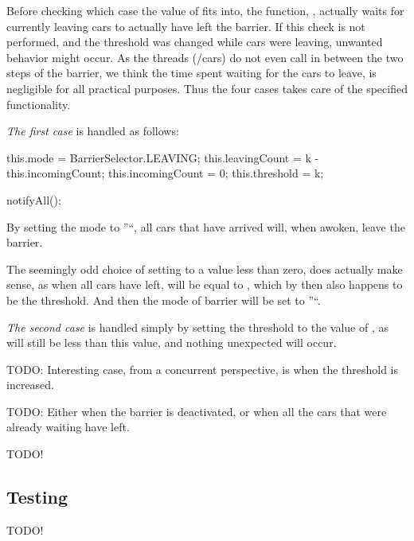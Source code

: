 Before checking which case the value of  fits into, the function, , actually waits for currently leaving cars to actually have left the barrier. If this check is not performed, and the threshold was changed while cars were leaving, unwanted behavior might occur. As the threads (/cars) do not even call  in between the two steps of the barrier, we think the time spent waiting for the cars to leave, is negligible for all practical purposes. Thus the four cases takes care of the specified functionality.

\emph{The first case} is handled as follows:
\begin{java}
this.mode = BarrierSelector.LEAVING;
this.leavingCount = k - this.incomingCount;
this.incomingCount = 0;
this.threshold = k;

notifyAll();
\end{java}

By setting the mode to ''``, all cars that have arrived will, when awoken, leave the barrier.

The seemingly odd choice of setting  to a value less than zero, does actually make sense, as when all cars have left,   will be equal to , which by then also happens to be the threshold. And then the mode of barrier will be set to ''``.

\emph{The second case} is handled simply by setting the threshold to the value of , as  will still be less than this value, and nothing unexpected will occur.


TODO: Interesting case, from a concurrent perspective, is when the threshold is increased.

TODO: Either when the barrier is deactivated, or when all the cars that were already waiting have left.

TODO!


\subsection{Testing}
\label{sub:bar-test}
TODO!